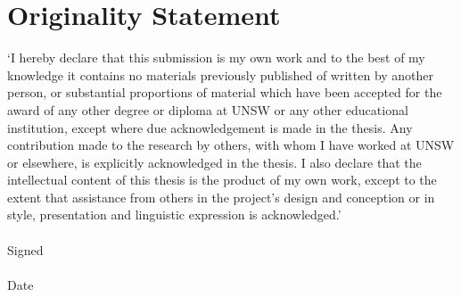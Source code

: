 \chapter*{Originality Statement}
`I hereby declare that this submission is my own work and to the best of my knowledge it contains
 no materials previously published of written by another person, or substantial proportions of 
material which have been accepted for the award of any other degree or diploma at UNSW or any other
 educational institution, except where due acknowledgement is made in the thesis. Any contribution 
made to the research by others, with whom I have worked at UNSW or elsewhere, is explicitly 
acknowledged in the thesis. I also declare that the intellectual content of this thesis is the product
 of my own work, except to the extent that assistance from others in the project's design and 
conception or in style, presentation and linguistic expression is acknowledged.'\\\\
Signed \dotfill\\\\
Date \dotfill
\\
\\
\\
\newpage
